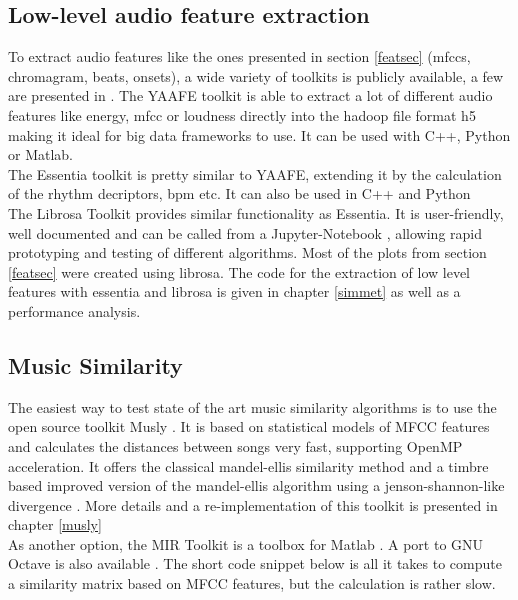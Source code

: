 \subsection{Low-level audio feature extraction}
To extract audio features like the ones presented in section \ref{featsec} (mfccs, chromagram, beats, onsets), a wide variety of toolkits is publicly available, a few are presented in \cite{audiofeattoolb}.
The YAAFE toolkit \cite{yaafe1} is able to extract a lot of different audio features like energy, mfcc or loudness directly into the hadoop file format h5 making it ideal for big data frameworks to use. It can be used with C++, Python or Matlab.\\
The Essentia toolkit \cite{essentia1} is pretty similar to YAAFE, extending it by the calculation of the rhythm decriptors, bpm etc. It can also be used in C++ and Python\\
The Librosa Toolkit provides similar functionality \cite{labrosa1} as Essentia. It is user-friendly, well documented and can be called from a Jupyter-Notebook \cite{jupyter}, allowing rapid prototyping and testing of different algorithms. Most of the plots from section \ref{featsec} were created using librosa. The code for the extraction of low level features with essentia and librosa is given in chapter \ref{simmet} as well as a performance analysis.\\

\subsection{Music Similarity}

The easiest way to test state of the art music similarity algorithms is to use the open source toolkit Musly \cite{musly1}. It is based on statistical models of MFCC features and calculates the distances between songs very fast, supporting OpenMP acceleration. It offers the classical mandel-ellis similarity method \cite{mandelellis1} and a timbre based improved version of the mandel-ellis algorithm using a jenson-shannon-like divergence \cite{musly2}. More details and a re-implementation of this toolkit is presented in chapter \ref{musly}\\
As another option, the MIR Toolkit \cite{mirtoolbox1} is a toolbox for Matlab \cite{matl1}. A port to GNU Octave \cite{octave1} is also available \cite{mirtoolbox2}. The short code snippet below is all it takes to compute a similarity matrix based on MFCC features, but the calculation is rather slow.

